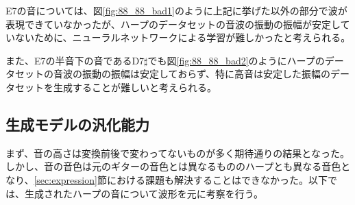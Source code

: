 \begin{description}
E7の音については、図\ref{fig:88_88_bad1}のように上記に挙げた以外の部分で波が表現できていなかったが、ハープのデータセットの音波の振動の振幅が安定していないために、ニューラルネットワークによる学習が難しかったと考えられる。

また、E7の半音下の音であるD7$\sharp$でも図\ref{fig:88_88_bad2}のようにハープのデータセットの音波の振動の振幅は安定しておらず、特に高音は安定した振幅のデータセットを生成することが難しいと考えられる。

\end{description}


\subsection{生成モデルの汎化能力}

まず、音の高さは変換前後で変わってないものが多く期待通りの結果となった。しかし、音の音色は元のギターの音色とは異なるもののハープとも異なる音色となり、\ref{sec:expression}節における課題も解決することはできなかった。以下では、生成されたハープの音について波形を元に考察を行う。


